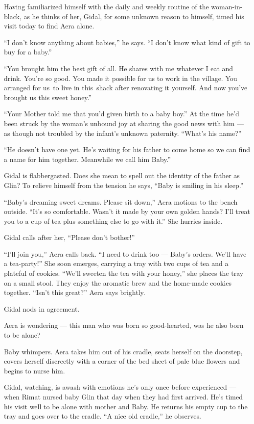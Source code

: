 \documentclass[twoside,11pt]{book}
\begin{document}
Having familiarized himself with the daily and weekly routine of the woman-in-black, as he thinks of her, Gidal, for
some unknown reason to himself, timed his visit today to find Aera alone.

 ``I don't know anything about babies,'' he says. ``I don't know what kind of
gift to buy for a baby.''

``You brought him the best gift of all. He shares with me whatever I eat and drink. You're so good. You
made it possible{ }for us to work in the village. You arranged for us~to live
in this~shack after renovating it yourself. And now you've brought us this sweet honey.''

``Your Mother told me that you'd given birth to a baby
boy.'' At the time he'd been struck by the woman's unbound joy at sharing the good news with him --- as
though not troubled by the infant's unknown paternity. ``What's his
name?''

``He doesn't have one yet. He's waiting for his father to come home so we can find a name for him together.
Meanwhile we call him Baby.''

Gidal is flabbergasted. Does she mean to spell out the identity of the father as Glin? To relieve himself from the
tension he says, ``Baby is smiling in his sleep.''

``Baby's dreaming sweet dreams. Please sit down,'' Aera motions to the bench
outside. ``It's so comfortable. Wasn't it made by your own
golden hands? I'll treat you to a cup of tea plus something else to go with it.'' She hurries inside.

Gidal calls after her, ``Please don't bother!''

``I'll join you,'' Aera calls back. ``I need to drink too --- Baby's orders. We'll
have a tea-party!'' She soon emerges, carrying a tray with two cups of tea and a plateful of cookies.
``We'll sweeten the tea with your honey,'' she
places the tray on a small stool. They enjoy the aromatic brew and the home-made cookies together. ``Isn't
this great?'' Aera says brightly.

Gidal nods in agreement.

Aera is wondering --- this man who was born so good-hearted, was he also born to be alone?

Baby whimpers. Aera takes him out of his cradle, seats herself on the doorstep, covers herself
discreetly with a corner of the bed sheet of pale blue flowers and begins to
nurse him.

Gidal, watching, is awash with emotions{ }he's only once before experienced --- when Rimat nursed baby
Glin that day when they had first arrived. He's timed his visit well to be alone with mother and Baby. He returns his
empty cup to the tray and goes over to the cradle. ``A nice old cradle,'' he
observes{.}
\end{document}

